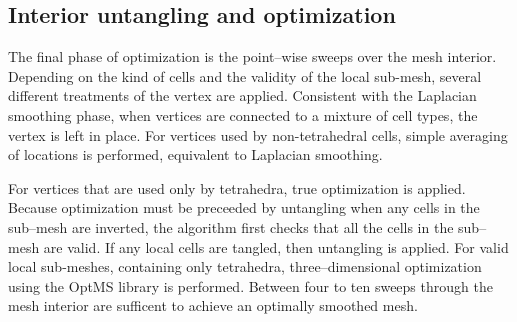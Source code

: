 \documentclass[a4paper,12pt,notitlepage]{article}
\begin{document}
\subsection{Interior untangling and optimization}
The final phase of optimization is the point--wise sweeps over the mesh
interior.   Depending on the kind of cells and the validity of the local sub-mesh, several different treatments of the vertex are applied. Consistent with the Laplacian smoothing phase, when vertices are connected to a mixture of cell types, the vertex is
left in place.  For vertices used by non-tetrahedral cells, simple averaging of locations is performed, equivalent to Laplacian smoothing.  

For vertices that are used only by tetrahedra, true optimization is applied.  Because optimization must be preceeded by untangling when any
cells in the sub--mesh are inverted, the algorithm first checks that all
the cells in the sub--mesh are valid.  If any local cells are tangled,
then untangling is applied.   For valid local sub-meshes, containing only tetrahedra,
three--dimensional optimization using the OptMS library is
performed.  Between four to ten sweeps through the mesh interior are sufficent to achieve an optimally smoothed mesh. 


%
%

\end{document}
